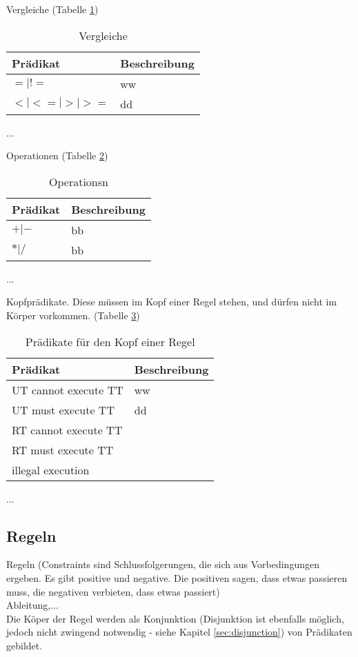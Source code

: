 Vergleiche (Tabelle \ref{tab:comparison})
\begin{table}[h]
\begin{tabular} {|p{6cm}|p{10cm}|}
\hline
\textbf{Prädikat} & \textbf{Beschreibung}\\
\hline
 $= | !=$		& ww \\
 $< | <= | > | >=$   	& dd \\
\hline
\end{tabular}
...
\caption{Vergleiche}
\label{tab:comparison}
\end{table}

Operationen (Tabelle \ref{tab:operations})
\begin{table}[h]
\begin{tabular} {|p{6cm}|p{10cm}|}
\hline
\textbf{Prädikat} & \textbf{Beschreibung}\\
\hline
 $+ |-$		& bb \\
 $ * | / $   	& bb \\
\hline
\end{tabular}
...
\caption{Operationsn}
\label{tab:operations}
\end{table}

Kopfprädikate. Diese müssen im Kopf einer Regel stehen, und dürfen nicht im Körper vorkommen. (Tabelle \ref{tab:head})
\begin{table}[h]
\begin{tabular} {|p{6cm}|p{10cm}|}
\hline
\textbf{Prädikat} & \textbf{Beschreibung}\\
\hline
UT cannot execute TT		& ww \\
UT must execute TT  		& dd \\
RT cannot execute TT		& \\
RT must execute TT		& \\
illegal execution		& \\
\hline
\end{tabular}
...
\caption{Prädikate für den Kopf einer Regel}
\label{tab:head}
\end{table}



\subsection{Regeln}
Regeln (Constraints sind Schlussfolgerungen, die sich aus Vorbedingungen ergeben. Es gibt positive und negative. Die positiven sagen, dass etwas passieren muss, die negativen verbieten, dass etwas passiert)\\
Ableitung,...\\
Die Köper der Regel werden als Konjunktion (Disjunktion ist ebenfalls möglich, jedoch nicht zwingend notwendig - siehe Kapitel \ref{sec:disjunction}) von Prädikaten gebildet.\\

